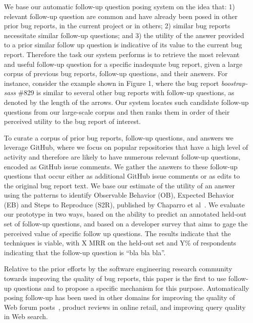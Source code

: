 %
We base our automatic follow-up question posing system on the idea that: 1) relevant follow-up question are common and have already been posed in other prior bug reports, in the current project or in others; 2) similar bug reports necessitate similar follow-up questions; and 3) the utility of the answer provided to a prior similar follow up question is indicative of its value to the current bug report.
%
Therefore the task our system performs is to retrieve the most relevant and useful follow-up question for a specific inadequate bug report, given a large corpus of previous bug reports, follow-up questions, and their answers.
%
For instance, consider the example shown in Figure 1, where the bug report {\em boostrap-sass} \#829 is similar to several other bug reports with follow-up questions, as denoted by the length of the arrows.
%
Our system locates such candidate follow-up questions from our large-scale corpus and then ranks them in order of their perceived utility to the bug report of interest.

To curate a corpus of prior bug reports, follow-up questions, and answers we leverage GitHub, where we focus on popular repositories that have a high level of activity and therefore are likely to have numerous relevant follow-up questions, encoded as GitHub issue comments. We gather the answers to these follow-up questions that occur either as additional GitHub issue comments or as edits to the original bug report text. We base our estimate of the utility of an answer using the patterns to identify Observable Behavior (OB), Expected Behavior (EB) and Steps to Reproduce (S2R), published by Chaparro et al~\cite{chaparro17detecting}. We evaluate our prototype in two ways, based on the ability to predict an annotated held-out set of follow-up questions, and based on a developer survey that aims to gage the perceived value of specific follow up questions. The results indicate that the techniques is viable, with X MRR on the held-out set and Y\% of respondents indicating that the follow-up question is “bla bla bla”.

Relative to the prior efforts by the software engineering research community towards improving the quality of bug reports, this paper is the first to use follow-up questions and to propose a specific mechanism for this purpose. Automatically posing follow-up has been used in other domains for improving the quality of Web forum posts~\cite{rao-daume-iii-2018-learning}, product reviews in online retail, and improving query quality in Web search.

%

